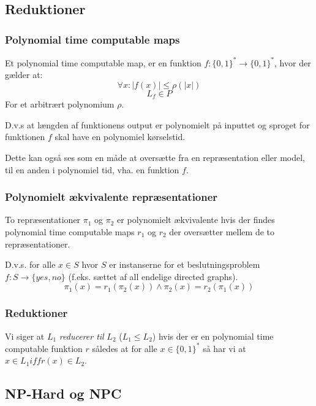 \documentclass[danish,a4paper,article,12pt]{article}
\begin{document}
\subsection{Reduktioner}

\subsubsection{Polynomial time computable maps}
Et polynomial time computable map, er en funktion $f:\{0,1\}^* \rightarrow \{0,1\}^*$, hvor der gælder at:
\begin{equation}
\forall x: |f(x)| \leq \rho(|x|)
\end{equation}
\begin{equation}
L_f \in P
\end{equation}
For et arbitrært polynomium $\rho$.

D.v.s at længden af funktionens output er polynomielt på inputtet og sproget for funktionen $f$ skal have en polynomiel kørselstid.

Dette kan også ses som en måde at oversætte fra en repræsentation eller model, til en anden i polynomiel tid, vha. en funktion $f$.

\subsubsection{Polynomielt ækvivalente repræsentationer}
To repræsentationer $\pi_1$ og $\pi_2$ er polynomielt ækvivalente hvis der findes polynomial time computable maps $r_1$ og $r_2$ der oversætter mellem de to repræsentationer.

D.v.s. for alle $x\in S$ hvor $S$ er instanserne for et beslutningsproblem $f:S\rightarrow \{yes,no\}$ (f.eks. sættet af all endelige directed graphs).
\begin{equation}
\pi_1(x)=r_1(\pi_2(x)) \wedge \pi_2(x)=r_2(\pi_1(x))
\end{equation}

\subsubsection{Reduktioner}
Vi siger at $L_1$ \emph{reducerer til} $L_2$ ($L_1 \leq L_2$) hvis der er en polynomial time computable funktion $r$ således at for alle $x\in \{0,1\}^*$ så har vi at $x\in L_1 iff r(x)\in L_2$.

\subsection{NP-Hard og NPC}
\end{document}
